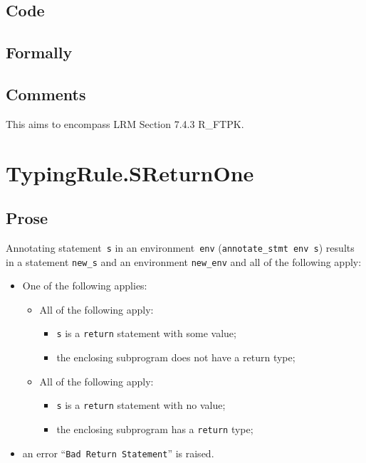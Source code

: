 \documentclass{book}
\begin{document}
  \subsection{Code}

\begin{emptyformal}
    \subsection{Formally}
\end{emptyformal}

\subsection{Comments}
    This aims to encompass LRM Section 7.4.3 R\_FTPK.


\section{TypingRule.SReturnOne \label{sec:TypingRule.SReturnOne}}

  \subsection{Prose}
Annotating statement~\texttt{s} in an environment~\texttt{env}
(\texttt{annotate\_stmt env s}) results in a statement \texttt{new\_s} and an
environment \texttt{new\_env} and all of the following apply:
   \begin{itemize}
   \item One of the following applies:
     \begin{itemize}
     \item All of the following apply:
       \begin{itemize}
       \item \texttt{s} is a \texttt{return} statement with some value;
       \item the enclosing subprogram does not have a return type;
       \end{itemize}
     \item All of the following apply:
       \begin{itemize}
       \item \texttt{s} is a \texttt{return} statement with no value;
       \item the enclosing subprogram has a \texttt{return} type;
       \end{itemize}
     \end{itemize}
   \item an error ``\texttt{Bad Return Statement}'' is raised.
   \end{itemize}
\end{document}
